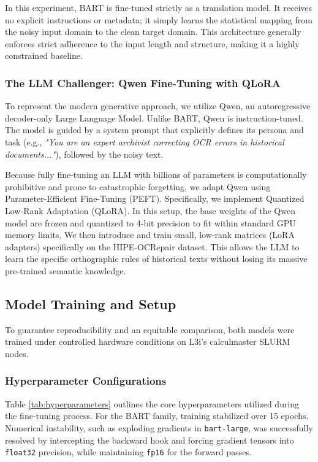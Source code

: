 \documentclass[11pt]{extarticle}
\begin{document}
In this experiment, BART is fine-tuned strictly as a translation model. It receives no explicit instructions or metadata; it simply learns the statistical mapping from the noisy input domain to the clean target domain. This architecture generally enforces strict adherence to the input length and structure, making it a highly constrained baseline.

\subsubsection{The LLM Challenger: Qwen Fine-Tuning with QLoRA}
To represent the modern generative approach, we utilize Qwen, an autoregressive decoder-only Large Language Model. Unlike BART, Qwen is instruction-tuned. The model is guided by a system prompt that explicitly defines its persona and task (e.g., \textit{"You are an expert archivist correcting OCR errors in historical documents..."}), followed by the noisy text.

Because fully fine-tuning an LLM with billions of parameters is computationally prohibitive and prone to catastrophic forgetting, we adapt Qwen using Parameter-Efficient Fine-Tuning (PEFT). Specifically, we implement Quantized Low-Rank Adaptation (QLoRA). In this setup, the base weights of the Qwen model are frozen and quantized to 4-bit precision to fit within standard GPU memory limits. We then introduce and train small, low-rank matrices (LoRA adapters) specifically on the HIPE-OCRepair dataset. This allows the LLM to learn the specific orthographic rules of historical texts without losing its massive pre-trained semantic knowledge.

\subsection{Model Training and Setup}
To guarantee reproducibility and an equitable comparison, both models were trained under controlled hardware conditions on L3i’s calculmaster SLURM nodes.

\subsubsection{Hyperparameter Configurations}
Table \ref{tab:hyperparameters} outlines the core hyperparameters utilized during the fine-tuning process. For the BART family, training stabilized over 15 epochs. Numerical instability, such as exploding gradients in \texttt{bart-large}, was successfully resolved by intercepting the backward hook and forcing gradient tensors into \texttt{float32} precision, while maintaining \texttt{fp16} for the forward passes.
\end{document}
